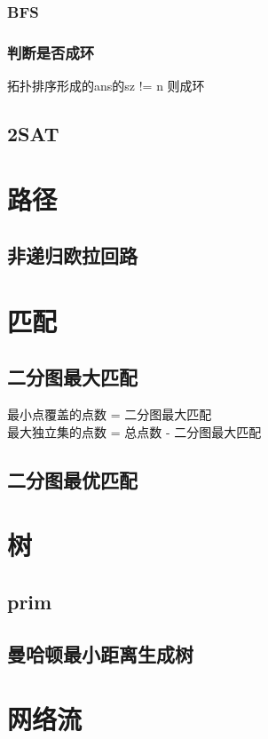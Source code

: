 \documentclass{report}
\begin{document}
            \subsubsection{BFS}
            \subsubsection{判断是否成环}
            拓扑排序形成的ans的sz != n 则成环
        \subsection{2SAT}
            
    \section{路径}
        \subsection{非递归欧拉回路}
            
    \section{匹配}
        \subsection{二分图最大匹配}
            最小点覆盖的点数 = 二分图最大匹配 \\
            最大独立集的点数 = 总点数 - 二分图最大匹配
        
        \subsection{二分图最优匹配}
            
    \section{树}
        \subsection{prim}
            
        \subsection{曼哈顿最小距离生成树}
            
    \section{网络流}
\end{document}
